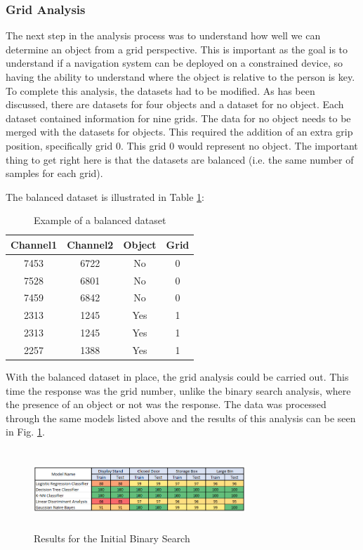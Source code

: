 \documentclass[conference]{IEEEtran}
\begin{document}
\subsubsection{Grid Analysis}
The next step in the analysis process was to understand how well we can determine an object from a grid perspective. This is important as the goal is to understand if a navigation system can be deployed on a constrained device, so having the ability to understand where the object is relative to the person is key. To complete this analysis, the datasets had to be modified. As has been discussed, there are datasets for four objects and a dataset for no object. Each dataset contained information for nine grids. The data for no object needs to be merged with the datasets for objects. This required the addition of an extra grip position, specifically grid 0. This grid 0 would represent no object. The important thing to get right here is that the datasets are balanced (i.e. the same number of samples for each grid). 

The balanced dataset is illustrated in Table \ref{table:3}:

\begin{table}[ht]
\centering
\begin{tabular}{||c c c c||} 
 \hline
 Channel1 & Channel2 & Object & Grid \\ [0.5ex] 
 \hline\hline
 7453 & 6722 & No & 0 \\ 
 \hline
 7528 & 6801 & No & 0 \\
 \hline
 7459 & 6842 & No & 0 \\
 \hline
  2313 & 1245 & Yes & 1 \\
 \hline
  2313 & 1245 & Yes & 1 \\
 \hline
 2257 & 1388 & Yes & 1 \\ [1ex] 
 \hline
\end{tabular}
\caption{Example of a balanced dataset}
\label{table:3}
\end{table}

With the balanced dataset in place, the grid analysis could be carried out. This time the response was the grid number, unlike the binary search analysis, where the presence of an object or not was the response. The data was processed through the same models listed above and the results of this analysis can be seen in Fig. \ref{fig:initial_analysis_gridsearch}.

\begin{figure}[h]
\includegraphics[width=8cm, height=3cm]{images/initial_analysis_gridsearch.png}
\centering
\caption{Results for the Initial Binary Search}
\label{fig:initial_analysis_gridsearch}
\end{figure}
\end{document}
